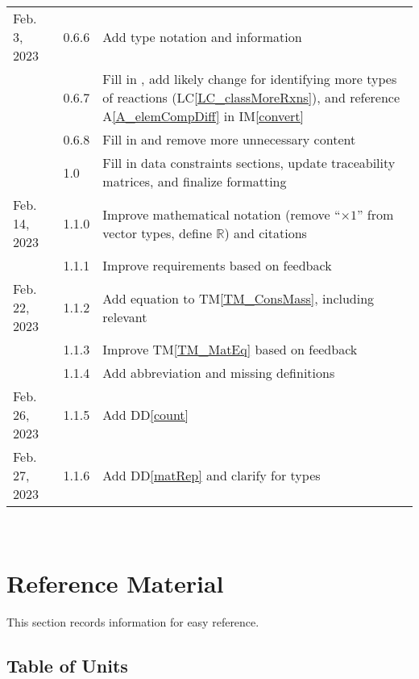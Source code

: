 \documentclass[12pt]{article}
\newcommand{\ddref}[1]{DD\ref{#1}}
\newcommand{\tmref}[1]{TM\ref{#1}}
\newcommand{\aref}[1]{A\ref{#1}}
\newcommand{\iref}[1]{IM\ref{#1}}
\newcommand{\lcref}[1]{LC\ref{#1}}
\begin{document}
\begin{tabularx}{\textwidth}{p{2.5cm}p{1.5cm}X}
  Feb. 3, 2023        & 0.6.6         & Add type notation and information                                    \\
                      & 0.6.7         & Fill in \nameref{sec_UCs}, add likely change for identifying
  more types of reactions (\lcref{LC_classMoreRxns}), and reference \aref{A_elemCompDiff} in \iref{convert}  \\
                      & 0.6.8         & Fill in \nameref{sec_traceMats} and remove more unnecessary content  \\
                      & 1.0           & Fill in data constraints sections, update traceability matrices, and
  finalize formatting                                                                                        \\
  Feb. 14, 2023       & 1.1.0         & Improve mathematical notation
  (remove ``$\times 1$'' from vector types, define $\mathbb{R}$) and citations                               \\
                      & 1.1.1         & Improve requirements based on feedback                               \\
  Feb. 22, 2023       & 1.1.2         & Add equation to \tmref{TM_ConsMass}, including relevant
  \nameref{sec_datatypes}                                                                                    \\
                      & 1.1.3         & Improve \tmref{TM_MatEq} based on feedback                           \\
                      & 1.1.4         & Add \progname{} abbreviation and missing definitions                 \\
  Feb. 26, 2023       & 1.1.5         & Add \ddref{count}                                                    \\
  Feb. 27, 2023       & 1.1.6         & Add \ddref{matRep} and clarify \nameref{sec_mathNot} for types       \\
  \bottomrule
\end{tabularx}

~\newpage

\section{Reference Material} \label{sec_refMat}

This section records information for easy reference.

\subsection{Table of Units} \label{sec_ToU}
\end{document}
